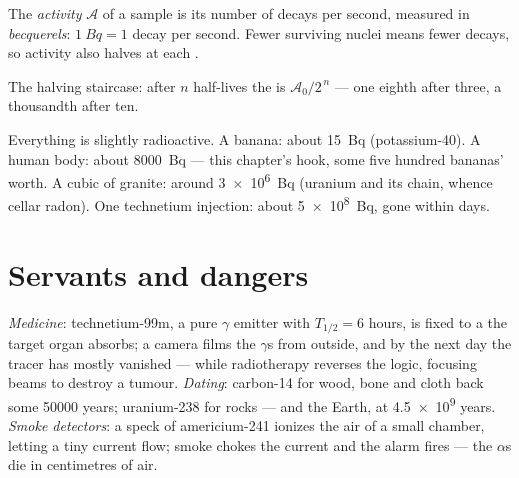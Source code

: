 \begin{definition}[Activity]\label{def:g11:nucleus-radioactivity:activity}
The \emph{activity} $\mathcal A$ of a sample is its number
of decays per second, measured in \emph{becquerels}:
$\qty{1}{Bq} = 1$ decay per second. Fewer surviving nuclei means fewer
decays, so activity also halves at each .
\end{definition}

\begin{omfigure}

{\small The halving staircase: after $n$ half-lives the  is
$\mathcal A_0/2^{\,n}$ --- one eighth after three, a thousandth after ten.}
\end{omfigure}

\begin{example}\label{ex:g11:nucleus-radioactivity:orders}
Everything is slightly radioactive. A banana: about \qty{15}{Bq}
(potassium-40). A human body: about \qty{8000}{Bq} --- this chapter's hook,
some five hundred bananas' worth. A cubic  of granite: around
\qty{3e6}{Bq} (uranium and its chain, whence cellar radon). One technetium
injection: about \qty{5e8}{Bq}, gone within days.
\end{example}

\section{Servants and dangers}

\begin{example}\label{ex:g11:nucleus-radioactivity:uses}
\emph{Medicine}: technetium-99m, a pure $\gamma$ emitter with
$T_{1/2} = 6$ hours, is fixed to a  the target organ absorbs; a
camera films the $\gamma$s from outside, and by the next day the tracer has
mostly vanished --- while radiotherapy reverses the logic, focusing beams to
destroy a tumour. \emph{Dating}: carbon-14 for wood, bone and cloth back
some \num{50000} years; uranium-238 for rocks --- and the Earth, at
\num{4.5e9} years. \emph{Smoke detectors}: a speck of americium-241 ionizes
the air of a small chamber, letting a tiny current flow; smoke chokes the
current and the alarm fires --- the $\alpha$s die in centimetres of air.
\end{example}

